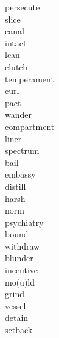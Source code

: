 \documentclass[a4paper, 11pt]{ctexart}
\begin{document}
\begin{multicols*}{3}
\begin{description}
\item[persecute]

\item[slice]

\item[canal]

\item[intact]

\item[lean]

\item[clutch]

\item[temperament]

\item[curl]

\item[pact]

\item[wander]

\item[compartment]

\item[liner]

\item[spectrum]

\item[bail]

\item[embassy]

\item[distill]

\item[harsh]

\item[norm]

\item[psychiatry]

\item[bound]

\item[withdraw]

\item[blunder]

\item[incentive]

\item[mo(u)ld]

\item[grind]

\item[vessel]

\item[detain]

\item[setback]


\end{description}
\end{multicols*}
\end{document}
